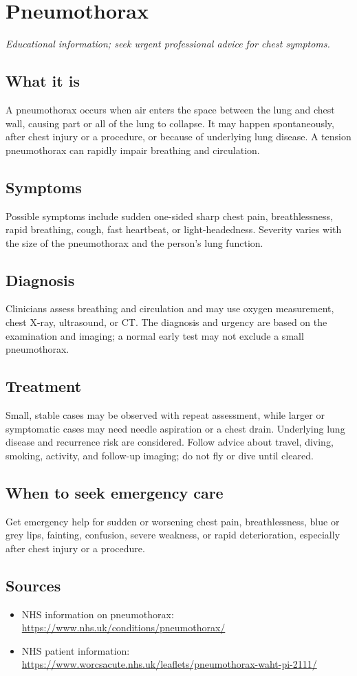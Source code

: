 \chapter{Pneumothorax}

\medskip
\noindent\textit{Educational information; seek urgent professional advice for chest symptoms.}

\section*{What it is}
A pneumothorax occurs when air enters the space between the lung and chest wall, causing part or all of the lung to collapse. It may happen spontaneously, after chest injury or a procedure, or because of underlying lung disease. A tension pneumothorax can rapidly impair breathing and circulation.

\section*{Symptoms}
Possible symptoms include sudden one-sided sharp chest pain, breathlessness, rapid breathing, cough, fast heartbeat, or light-headedness. Severity varies with the size of the pneumothorax and the person’s lung function.

\section*{Diagnosis}
Clinicians assess breathing and circulation and may use oxygen measurement, chest X-ray, ultrasound, or CT. The diagnosis and urgency are based on the examination and imaging; a normal early test may not exclude a small pneumothorax.

\section*{Treatment}
Small, stable cases may be observed with repeat assessment, while larger or symptomatic cases may need needle aspiration or a chest drain. Underlying lung disease and recurrence risk are considered. Follow advice about travel, diving, smoking, activity, and follow-up imaging; do not fly or dive until cleared.

\section*{When to seek emergency care}
Get emergency help for sudden or worsening chest pain, breathlessness, blue or grey lips, fainting, confusion, severe weakness, or rapid deterioration, especially after chest injury or a procedure.

\section*{Sources}
\begin{itemize}
\item NHS information on pneumothorax: \url{https://www.nhs.uk/conditions/pneumothorax/}
\item NHS patient information: \url{https://www.worcsacute.nhs.uk/leaflets/pneumothorax-waht-pi-2111/}
\end{itemize}
